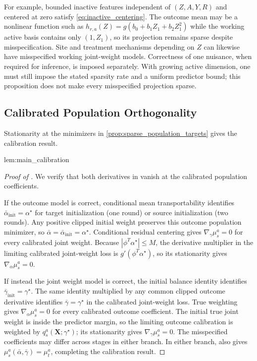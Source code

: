\documentclass[12pt]{article}
\begin{document}
For example, bounded inactive features independent of $(Z,A,Y,R)$ and centered at zero satisfy \cref{eq:inactive_centering}. The outcome mean may be a nonlinear function such as $h_{r,a}(Z)=g(b_0+b_1Z_1+b_2Z_1^2)$ while the working active basis contains only $(1,Z_1)$, so its projection remains sparse despite misspecification. Site and treatment mechanisms depending on $Z$ can likewise have misspecified working joint-weight models. Correctness of one nuisance, when required for inference, is imposed separately. With growing active dimension, one must still impose the stated sparsity rate and a uniform predictor bound; this proposition does not make every misspecified projection sparse.

\subsection{Calibrated Population Orthogonality}\label{supp:pairwise_technical_lemmas}
Stationarity at the minimizers in \cref{prop:sparse_population_targets} gives the calibration result.

\begin{restatedmain}{lem:main_calibration}
\FACEHDSourceCalibration
\end{restatedmain}
\label{proof:main_calibration}
\begin{proof}[Proof of ]
We verify that both derivatives in  vanish at the calibrated population coefficients.

If the outcome model is correct, conditional mean transportability identifies $\bar\alpha_{\mathrm{init}}=\alpha^\star$ for target initialization (one round) or source initialization (two rounds). Any positive clipped initial weight preserves this outcome population minimizer, so $\bar\alpha=\bar\alpha_{\mathrm{init}}=\alpha^\star$. Conditional residual centering gives $\nabla_\gamma\mu_s^a=0$ for every calibrated joint weight. Because $|\phi^T\alpha^\star|\le M$, the derivative multiplier in the limiting calibrated joint-weight loss is $g'(\phi^T\alpha^\star)$, so its stationarity gives $\nabla_\alpha\mu_s^a=0$.

If instead the joint weight model is correct, the initial balance identity identifies $\bar\gamma_{\mathrm{init}}=\gamma^\star$. The same identity multiplied by any common clipped outcome derivative identifies $\bar\gamma=\gamma^\star$ in the calibrated joint-weight loss. True weighting gives $\nabla_\alpha\mu_s^a=0$ for every calibrated outcome coefficient. The initial true joint weight is inside the predictor margin, so the limiting outcome calibration is weighted by $q_{s}^a(\boldsymbol X;\gamma^\star)$; its stationarity gives $\nabla_\gamma\mu_s^a=0$. The misspecified coefficients may differ across stages in either branch. In either branch,  also gives $\mu_s^a(\bar\alpha,\bar\gamma)=\mu_t^a$, completing the calibration result.
\end{proof}
\end{document}
